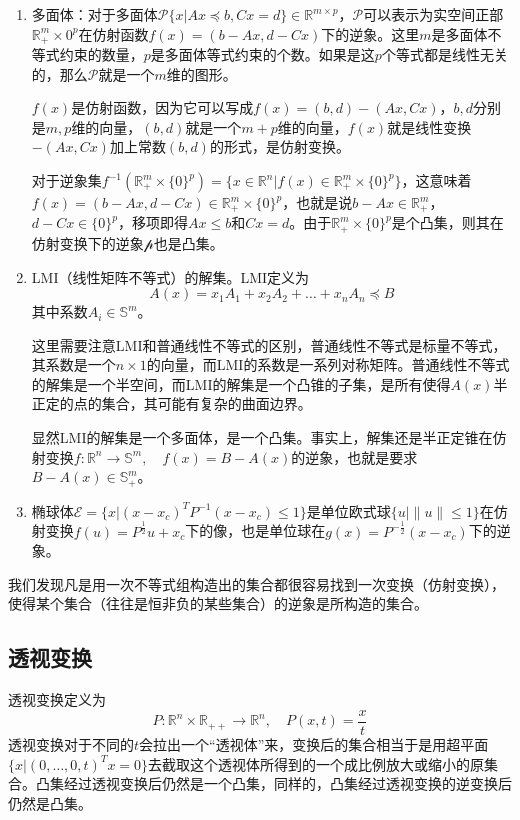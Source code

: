 \documentclass[12pt,a4paper]{book}
\begin{document}
\begin{enumerate}
    \item 多面体：对于多面体$\mathcal{P}\{x|Ax\preceq b,Cx=d\}\in\mathbb{R}^{m\times p}$，$\mathcal{P}$可以表示为实空间正部$\mathbb{R}^m_+\times {0}^p$在仿射函数$f(x)=(b-Ax,d-Cx)$下的逆象。这里$m$是多面体不等式约束的数量，$p$是多面体等式约束的个数。如果是这$p$个等式都是线性无关的，那么$\mathcal{P}$就是一个$m$维的图形。
    
    $f(x)$是仿射函数，因为它可以写成$f(x)=(b,d) - (Ax,Cx)$，$b,d$分别是$m,p$维的向量，$(b,d)$就是一个$m+p$维的向量，$f(x)$就是线性变换$-(Ax,Cx)$加上常数$(b,d)$的形式，是仿射变换。

    对于逆象集$f^{-1}(\mathbb{R}^m_+\times \{0\}^p)=\{x\in\mathbb{R}^n|f(x)\in\mathbb{R}^m_+\times\{0\}^p\}$，这意味着$f(x)=(b-Ax,d-Cx)\in\mathbb{R}^m_+\times\{0\}^p$，也就是说$b-Ax\in\mathbb{R}^m_+$，$d-Cx\in\{0\}^p$，移项即得$Ax\leq b$和$Cx=d$。由于$\mathbb{R}^m_+\times\{0\}^p$是个凸集，则其在仿射变换下的逆象$\mathcal{p}$也是凸集。
    \item LMI（线性矩阵不等式）的解集。LMI定义为
    $$A(x) = x_1A_1+x_2A_2+\ldots+x_nA_n \preceq B$$
    其中系数$A_i \in \mathbb{S}^m$。

    这里需要注意LMI和普通线性不等式的区别，普通线性不等式是标量不等式，其系数是一个$n\times 1$的向量，而LMI的系数是一系列对称矩阵。普通线性不等式的解集是一个半空间，而LMI的解集是一个凸锥的子集，是所有使得$A(x)$半正定的点的集合，其可能有复杂的曲面边界。

    显然LMI的解集是一个多面体，是一个凸集。事实上，解集还是半正定锥在仿射变换$f:\mathbb{R}^n\to\mathbb{S}^m,\quad f(x)=B-A(x)$的逆象，也就是要求$B-A(x)\in\mathbb{S}^m_+$。

    \item 椭球体$\mathcal{E}=\{x|(x-x_c)^TP^{-1}(x-x_c)\leq 1\}$是单位欧式球$\{u|\|u\|\leq 1\}$在仿射变换$f(u)=P^{\frac{1}{2}}u+x_c$下的像，也是单位球在$g(x)=P^{-\frac{1}{2}}(x-x_c)$下的逆象。
\end{enumerate}

我们发现凡是用一次不等式组构造出的集合都很容易找到一次变换（仿射变换），使得某个集合（往往是恒非负的某些集合）的逆象是所构造的集合。

\subsection{透视变换}

透视变换定义为
$$P:\mathbb{R}^n\times\mathbb{R}_{++} \to\mathbb{R}^n,\quad P(x,t)=\frac{x}{t}$$
透视变换对于不同的$t$会拉出一个“透视体”来，变换后的集合相当于是用超平面$\{x|(0,\ldots,0,t)^Tx=0\}$去截取这个透视体所得到的一个成比例放大或缩小的原集合。凸集经过透视变换后仍然是一个凸集，同样的，凸集经过透视变换的逆变换后仍然是凸集。
\end{document}
